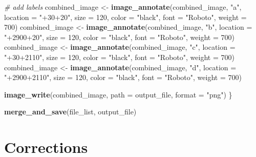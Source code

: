 \documentclass[12pt, twoside]{amherstthesis}
\newenvironment{Shaded}{\begin{snugshade}}{\end{snugshade}}
\newcommand{\AttributeTok}[1]{\textcolor[rgb]{0.13,0.29,0.53}{#1}}
\newcommand{\CommentTok}[1]{\textcolor[rgb]{0.56,0.35,0.01}{\textit{#1}}}
\newcommand{\DecValTok}[1]{\textcolor[rgb]{0.00,0.00,0.81}{#1}}
\newcommand{\FunctionTok}[1]{\textcolor[rgb]{0.13,0.29,0.53}{\textbf{#1}}}
\newcommand{\NormalTok}[1]{#1}
\newcommand{\OtherTok}[1]{\textcolor[rgb]{0.56,0.35,0.01}{#1}}
\newcommand{\StringTok}[1]{\textcolor[rgb]{0.31,0.60,0.02}{#1}}
\begin{document}
\begin{Shaded}
\begin{Highlighting}[]
  \CommentTok{\# add labels}
\NormalTok{  combined\_image }\OtherTok{\textless{}{-}} \FunctionTok{image\_annotate}\NormalTok{(combined\_image, }\StringTok{"a"}\NormalTok{, }\AttributeTok{location =} \StringTok{"+30+20"}\NormalTok{, }
                                   \AttributeTok{size =} \DecValTok{120}\NormalTok{, }\AttributeTok{color =} \StringTok{"black"}\NormalTok{, }\AttributeTok{font =} \StringTok{"Roboto"}\NormalTok{, }\AttributeTok{weight =} \DecValTok{700}\NormalTok{)}
\NormalTok{  combined\_image }\OtherTok{\textless{}{-}} \FunctionTok{image\_annotate}\NormalTok{(combined\_image, }\StringTok{"b"}\NormalTok{, }\AttributeTok{location =} \StringTok{"+2900+20"}\NormalTok{, }
                                   \AttributeTok{size =} \DecValTok{120}\NormalTok{, }\AttributeTok{color =} \StringTok{"black"}\NormalTok{, }\AttributeTok{font =} \StringTok{"Roboto"}\NormalTok{, }\AttributeTok{weight =} \DecValTok{700}\NormalTok{)}
\NormalTok{  combined\_image }\OtherTok{\textless{}{-}} \FunctionTok{image\_annotate}\NormalTok{(combined\_image, }\StringTok{"c"}\NormalTok{, }\AttributeTok{location =} \StringTok{"+30+2110"}\NormalTok{, }
                                   \AttributeTok{size =} \DecValTok{120}\NormalTok{, }\AttributeTok{color =} \StringTok{"black"}\NormalTok{, }\AttributeTok{font =} \StringTok{"Roboto"}\NormalTok{, }\AttributeTok{weight =} \DecValTok{700}\NormalTok{)}
\NormalTok{  combined\_image }\OtherTok{\textless{}{-}} \FunctionTok{image\_annotate}\NormalTok{(combined\_image, }\StringTok{"d"}\NormalTok{, }\AttributeTok{location =} \StringTok{"+2900+2110"}\NormalTok{, }
                                   \AttributeTok{size =} \DecValTok{120}\NormalTok{, }\AttributeTok{color =} \StringTok{"black"}\NormalTok{, }\AttributeTok{font =} \StringTok{"Roboto"}\NormalTok{, }\AttributeTok{weight =} \DecValTok{700}\NormalTok{)}
  
  \FunctionTok{image\_write}\NormalTok{(combined\_image, }\AttributeTok{path =}\NormalTok{ output\_file, }\AttributeTok{format =} \StringTok{"png"}\NormalTok{)}
\NormalTok{\}}

\FunctionTok{merge\_and\_save}\NormalTok{(file\_list, output\_file)}
\end{Highlighting}
\end{Shaded}
\normalsize

\hypertarget{corrections}{%
\chapter*{Corrections}\label{corrections}}
\end{document}
